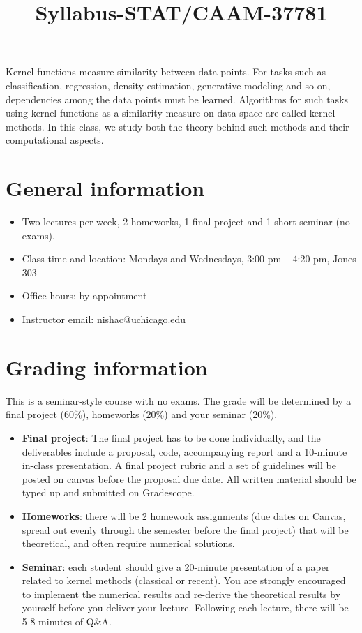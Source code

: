 \documentclass[12pt]{article}
\title{Syllabus-STAT/CAAM-37781}
\begin{document}
\MakeScribeTop
Kernel functions measure similarity between data points. For tasks such as classification, regression, 
density estimation, generative modeling and so on, dependencies among the data points must be learned.
Algorithms for such tasks using kernel functions as a similarity measure on data space are called kernel methods. 
In this class, we study both the theory behind such methods and their computational aspects. 
\section{General information}
\begin{itemize}
	\item Two lectures per week, 2 homeworks, 1 final project and 1 short seminar (no exams).
	\item Class time and location: Mondays and Wednesdays, 3:00 pm -- 4:20 pm, Jones 303
	\item Office hours: by appointment
	\item Instructor email: nishac@uchicago.edu
\end{itemize}

\section{Grading information}

This is a seminar-style course with no exams. The grade will be determined by a final project (60\%), homeworks (20\%) and your seminar (20\%). 
\begin{itemize}
\item \textbf{Final project}: The final project has to be done individually, and the deliverables include a proposal, code, accompanying report and a 10-minute in-class presentation. A final project rubric and a set of guidelines will be posted on canvas before the proposal due date. All written material should be typed up and submitted on Gradescope. 
\item \textbf{Homeworks}: there will be 2 homework assignments (due dates on Canvas, spread out evenly through the semester before the final project) that will be theoretical, and often require numerical solutions. 
\item \textbf{Seminar}: each student should give a 20-minute presentation of a paper related to kernel methods (classical or recent). You are strongly encouraged to implement the numerical results and re-derive the theoretical results by yourself before you deliver your lecture. Following each lecture, there will be 5-8 minutes of Q\&A.
\end{itemize}
\end{document}
